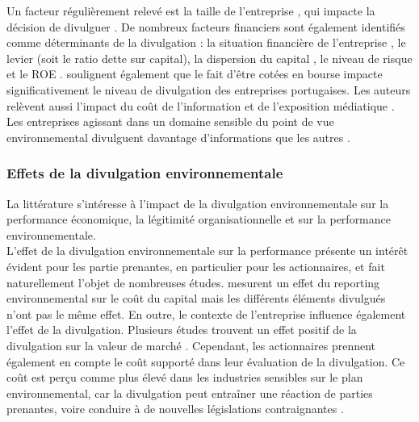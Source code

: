             Un facteur régulièrement relevé est la taille de l'entreprise \parencite{cormier1999corporate}, qui impacte la décision de divulguer \parencite{bouten2012how}. De nombreux facteurs financiers sont également identifiés comme déterminants de la divulgation : la situation financière de l'entreprise \parencite{cormier1999corporate}, le levier (soit le ratio dette sur capital), la dispersion du capital , le niveau de risque et le ROE \parencite{bouten2012how}. \textcite{da_silva_monteiro2010determinants} soulignent également que le fait d'être cotées en bourse impacte significativement le niveau de divulgation des entreprises portugaises. Les auteurs relèvent aussi l'impact du coût de l'information \parencite{cormier2004impact} et de l'exposition médiatique \parencite{bouten2012how}. Les entreprises agissant dans un domaine sensible du point de vue environnemental divulguent davantage d'informations que les autres \parencite{aerts2008corporate, radhouane2018customer-related}.




        \subsubsection{Effets de la divulgation environnementale}

            La littérature s'intéresse à l'impact de la divulgation environnementale sur la performance économique, la légitimité organisationnelle et sur  la performance environnementale. \\

            L'effet de la divulgation environnementale sur la performance présente un intérêt évident pour les partie prenantes, en particulier pour les actionnaires, et fait naturellement l'objet de nombreuses études. \textcite{cormier2007revisited} mesurent un effet du reporting environnemental sur le coût du capital mais les différents éléments divulgués n'ont pas le même effet. En outre, le contexte de l'entreprise influence également l'effet de la divulgation. Plusieurs études trouvent un effet positif de la divulgation sur la valeur de marché \parencite{radhouane2018customer-related, cormier2015does, plumlee2015voluntary, aerts2008corporate}. Cependant, les actionnaires prennent également en compte le coût supporté dans leur évaluation de la divulgation. Ce coût est perçu comme plus élevé dans les industries sensibles sur le plan environnemental, car la divulgation peut entraîner une réaction de parties prenantes, voire conduire à de nouvelles législations contraignantes \parencite{radhouane2018customer-related}. \\

